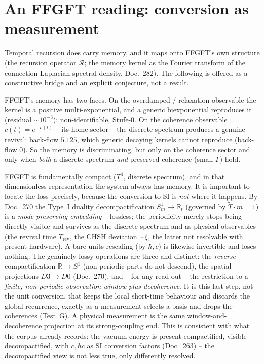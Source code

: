 \section{An FFGFT reading: conversion as measurement}\label{sec:ffgft}
Temporal recursion does carry memory, and it maps onto FFGFT's own structure (the
recursion operator $\mathcal{R}$; the memory kernel as the Fourier transform of the
connection-Laplacian spectral density, Doc.~282). The following is offered as a
constructive bridge and an explicit conjecture, not a result.

FFGFT's memory has two faces. On the overdamped / relaxation observable the kernel is a
positive multi-exponential, and a generic biexponential reproduces it (residual
$\sim10^{-3}$): non-identifiable, Stufe-0. On the coherence observable
$c(t)=e^{-\Gamma(t)}$ -- its home sector -- the discrete spectrum produces a genuine
revival: back-flow $5.125$, which generic decaying kernels cannot reproduce (back-flow
$0$). So the memory is discriminating, but only on the coherence sector and only when
\emph{both} a discrete spectrum \emph{and} preserved coherence (small $\Gamma$) hold.

FFGFT is fundamentally compact ($T^4$, discrete spectrum), and in that dimensionless
representation the system always has memory. It is important to locate the loss precisely,
because the conversion to SI is \emph{not} where it happens. By Doc.~270 the Type~I duality
decompactification $S^1_m\!\to\!\mathbb{R}_t$ (governed by $\tilde{T}\cdot m=1$) is a
\emph{mode-preserving embedding} -- lossless; the periodicity merely stops being directly
visible and survives as the discrete spectrum and as physical observables (the revival time
$T_\text{rev}$, the CHSH deviation $\sim\xi$, the latter not resolvable with present hardware). A bare units rescaling (by $\hbar,c$) is
likewise invertible and loses nothing. The genuinely lossy operations are three and
distinct: the \emph{reverse} compactification $\mathbb{R}\!\to\!S^1$ (non-periodic parts do
not descend), the spatial projections $D3\!\to\!D0$ (Doc.~270), and -- for any read-out --
the restriction to a \emph{finite, non-periodic observation window plus decoherence}. It is
this last step, not the unit conversion, that keeps the local short-time behaviour and
discards the global recurrence, exactly as a measurement selects a basis and drops the
coherences (Test~G). A physical measurement is the same window-and-decoherence projection
at its strong-coupling end. This is consistent with what the corpus already records: the
vacuum energy is present compactified, visible decompactified, with $c,\hbar c$ as SI
conversion factors (Doc.~263) -- the decompactified view is not less true, only differently
resolved.

